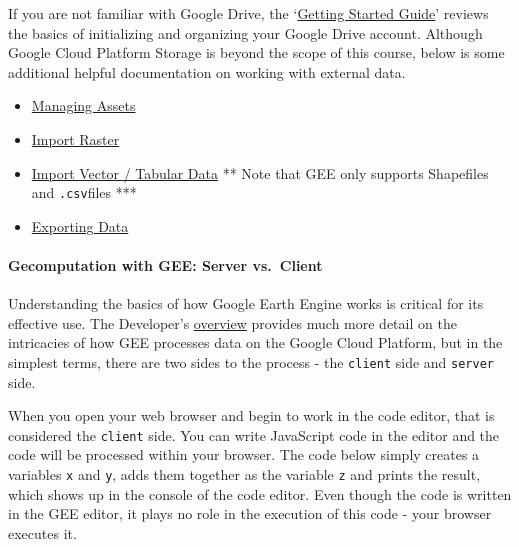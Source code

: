 \documentclass[
]{article}
\providecommand{\tightlist}{%
  \setlength{\itemsep}{0pt}\setlength{\parskip}{0pt}}
\begin{document}
If you are not familiar with Google Drive, the `\href{https://support.google.com/a/users/answer/9282958?hl=en}{Getting Started Guide}' reviews the basics of initializing and organizing your Google Drive account. Although Google Cloud Platform Storage is beyond the scope of this course, below is some additional helpful documentation on working with external data.

\begin{itemize}
\tightlist
\item
  \href{https://developers.google.com/earth-engine/guides/asset_manager}{Managing Assets}
\item
  \href{https://developers.google.com/earth-engine/guides/image_upload}{Import Raster}
\item
  \href{https://developers.google.com/earth-engine/guides/table_upload}{Import Vector / Tabular Data} ** Note that GEE only supports Shapefiles and \texttt{.csv}files ***
\item
  \href{https://developers.google.com/earth-engine/guides/exporting}{Exporting Data}
\end{itemize}

\hypertarget{gecomputation-with-gee-server-vs.-client}{%
\paragraph{Gecomputation with GEE: Server vs.~Client}\label{gecomputation-with-gee-server-vs.-client}}

Understanding the basics of how Google Earth Engine works is critical for its effective use. The Developer's \href{https://developers.google.com/earth-engine/guides/concepts_overview}{overview} provides much more detail on the intricacies of how GEE processes data on the Google Cloud Platform, but in the simplest terms, there are two sides to the process - the \texttt{client} side and \texttt{server} side.

When you open your web browser and begin to work in the code editor, that is considered the \texttt{client} side. You can write JavaScript code in the editor and the code will be processed within your browser. The code below simply creates a variables \texttt{x} and \texttt{y}, adds them together as the variable \texttt{z} and prints the result, which shows up in the console of the code editor. Even though the code is written in the GEE editor, it plays no role in the execution of this code - your browser executes it.
\end{document}
